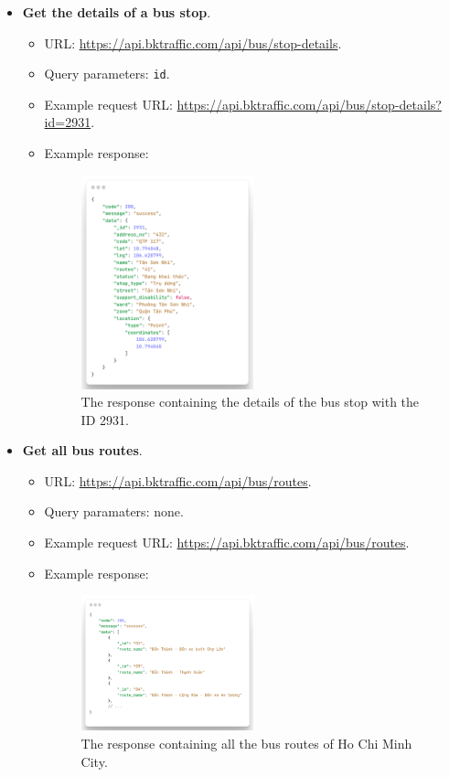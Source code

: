 \begin{itemize}
    \item \textbf{Get the details of a bus stop}.
    \begin{itemize}
        \item URL: \url{https://api.bktraffic.com/api/bus/stop-details}.
        \item Query parameters: \lstinline{id}.
        \item Example request URL: \url{https://api.bktraffic.com/api/bus/stop-details?id=2931}.
        \item Example response:
        \begin{figure}[H]
            \centering
            \includegraphics[width=0.5\textwidth]{assets/images/Implementation/stop_detail_response.png}
            \caption{The response containing the details of the bus stop with the ID 2931.}
            \label{fig:stop_detail_response}
        \end{figure}
    \end{itemize}

    \item \textbf{Get all bus routes}.
    \begin{itemize}
        \item URL: \url{https://api.bktraffic.com/api/bus/routes}.
        \item Query paramaters: none.
        \item Example request URL: \url{https://api.bktraffic.com/api/bus/routes}.
        \item Example response:
        \begin{figure}[H]
            \centering
            \includegraphics[width=0.5\textwidth]{assets/images/Implementation/all_routes_response.png}
            \caption{The response containing all the bus routes of Ho Chi Minh City.}
            \label{fig:all_routes_response}
        \end{figure}
    \end{itemize}


\end{itemize}
